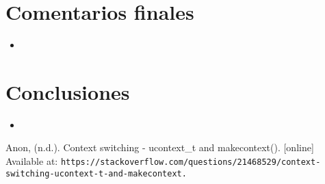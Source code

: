 \documentclass{article}
\begin{document}
\section{Comentarios finales}
\begin{itemize}
  \item 
\end{itemize}

\section{Conclusiones}
\begin{itemize}
  \item 
\end{itemize}

\begin{thebibliography}{99}
   Anon, (n.d.). Context switching - ucontext\_t and makecontext(). [online] Available at: \texttt{https://stackoverflow.com/questions/21468529/context-switching-ucontext-t-and-makecontext.}
\end{thebibliography}
\end{document}
